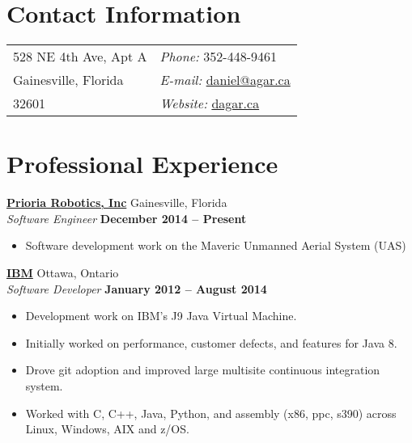 \documentclass[margin,line]{res}
\begin{document}

\begin{resume}


  \section{\sc Contact Information}

    \vspace{.05in}

    \begin{tabular}{@{}p{3.5in}p{4in}}
      528 NE 4th Ave, Apt A                  & {\it Phone:}  352-448-9461 \\                     
      Gainesville, Florida         & {\it E-mail:}  \href{mailto:daniel@agar.ca}{daniel@agar.ca}\\       
      32601                          & {\it Website:} \href{http://dagar.ca}{dagar.ca} \\     
    \end{tabular}
    
    

  \section{\sc Professional Experience}

        \href{http://www.prioria.com/}{\bf Prioria Robotics, Inc} {\hfill Gainesville, Florida}\\
      {\em Software Engineer} \hfill {\bf December 2014 -- Present}
      \begin{itemize} \itemsep -2pt
        \item Software development work on the Maveric Unmanned Aerial System (UAS)
      \end{itemize}
  
        \href{http://www.ibm.com/ca/en/}{\bf IBM} {\hfill Ottawa, Ontario}\\
      {\em Software Developer} \hfill {\bf January 2012 -- August 2014}
      \begin{itemize} \itemsep -2pt
        \item Development work on IBM's J9 Java Virtual Machine.
        \item Initially worked on performance, customer defects, and features for Java 8.
        \item Drove git adoption and improved large multisite continuous integration system.
        \item Worked with C, C++, Java, Python, and assembly (x86, ppc, s390) across Linux, Windows, AIX and z/OS.


\end{itemize}
\end{resume}
\end{document}
